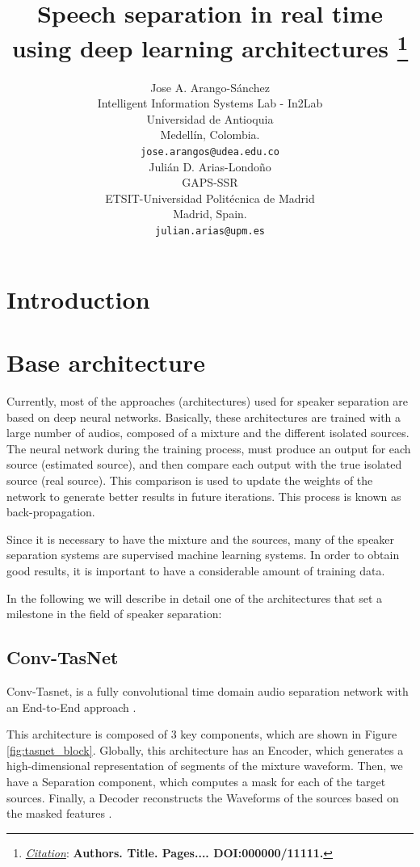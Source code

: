 \documentclass{article}
\title{Speech separation in real time using deep learning architectures
\thanks{\textit{\underline{Citation}}: 
\textbf{Authors. Title. Pages.... DOI:000000/11111.}} 
}
\author{
  Jose A. Arango-Sánchez \\
  Intelligent Information Systems Lab - In2Lab \\
  Universidad de Antioquia \\
  Medellín, Colombia.\\
  \texttt{jose.arangos@udea.edu.co} \\
   \And
  Julián D. Arias-Londoño \\
  GAPS-SSR \\
  ETSIT-Universidad Politécnica de Madrid \\
  Madrid, Spain.\\
  \texttt{julian.arias@upm.es} \\
}
\begin{document}
\maketitle


\begin{abstract}

\end{abstract}




\section{Introduction}



\section{Base architecture}
Currently, most of the approaches (architectures) used for speaker separation are based on deep neural networks. Basically, these architectures are trained with a large number of audios, composed of a mixture and the different isolated sources. The neural network during the training process, must produce an output for each source (estimated source), and then compare each output with the true isolated source (real source). This comparison is used to update the weights of the network to generate better results in future iterations. This process is known as back-propagation.

Since it is necessary to have the mixture and the sources, many of the speaker separation systems are supervised machine learning systems. In order to obtain good results, it is important to have a considerable amount of training data.

In the following we will describe in detail one of the architectures that set a milestone in the field of speaker separation:

\subsection{Conv-TasNet}
Conv-Tasnet, is a fully convolutional time domain audio separation network with an End-to-End approach \cite{luo2019conv}.

This architecture is composed of 3 key components, which are shown in Figure \ref{fig:tasnet_block}. Globally, this architecture has an Encoder, which generates a high-dimensional representation of segments of the mixture waveform. Then, we have a Separation component, which computes a mask for each of the target sources. Finally, a Decoder reconstructs the Waveforms of the sources based on the masked features \cite{luo2019conv}.
\end{document}
